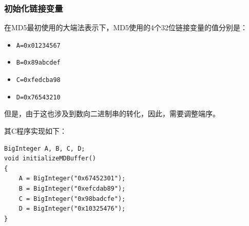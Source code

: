 \subsubsection{初始化链接变量}
在MD5最初使用的大端法表示下，MD5使用的4个32位链接变量的值分别是：
\begin{itemize}
	\item \verb`A=0x01234567`
	\item \verb`B=0x89abcdef`
	\item \verb`C=0xfedcba98`
	\item \verb`D=0x76543210`
\end{itemize}

但是，由于这也涉及到数向二进制串的转化，因此，需要调整端序。\par
其C程序实现如下：
\begin{prove}
\begin{verbatim}
BigInteger A, B, C, D;
void initializeMDBuffer()
{
    A = BigInteger("0x67452301");
    B = BigInteger("0xefcdab89");
    C = BigInteger("0x98badcfe");
    D = BigInteger("0x10325476");
}
\end{verbatim}
\end{prove}
